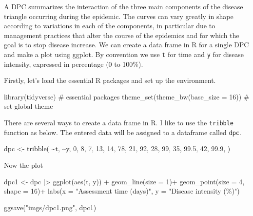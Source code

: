 \documentclass[
  letterpaper,
  DIV=11,
  numbers=noendperiod]{scrreprt}
\newenvironment{Shaded}{\begin{snugshade}}{\end{snugshade}}
\newcommand{\AttributeTok}[1]{\textcolor[rgb]{0.40,0.45,0.13}{#1}}
\newcommand{\CommentTok}[1]{\textcolor[rgb]{0.37,0.37,0.37}{#1}}
\newcommand{\DecValTok}[1]{\textcolor[rgb]{0.68,0.00,0.00}{#1}}
\newcommand{\FloatTok}[1]{\textcolor[rgb]{0.68,0.00,0.00}{#1}}
\newcommand{\FunctionTok}[1]{\textcolor[rgb]{0.28,0.35,0.67}{#1}}
\newcommand{\NormalTok}[1]{\textcolor[rgb]{0.00,0.23,0.31}{#1}}
\newcommand{\OtherTok}[1]{\textcolor[rgb]{0.00,0.23,0.31}{#1}}
\newcommand{\SpecialCharTok}[1]{\textcolor[rgb]{0.37,0.37,0.37}{#1}}
\newcommand{\StringTok}[1]{\textcolor[rgb]{0.13,0.47,0.30}{#1}}
\begin{document}
A DPC summarizes the interaction of the three main components of the
disease triangle occurring during the epidemic. The curves can vary
greatly in shape according to variations in each of the components, in
particular due to management practices that alter the course of the
epidemics and for which the goal is to stop disease increase. We can
create a data frame in R for a single DPC and make a plot using ggplot.
By convention we use \texttt{t} for time and \texttt{y} for disease
intensity, expressed in percentage (0 to 100\%).

Firstly, let's load the essential R packages and set up the environment.

\begin{Shaded}
\begin{Highlighting}[]
\FunctionTok{library}\NormalTok{(tidyverse) }\CommentTok{\# essential packages }
\FunctionTok{theme\_set}\NormalTok{(}\FunctionTok{theme\_bw}\NormalTok{(}\AttributeTok{base\_size =} \DecValTok{16}\NormalTok{)) }\CommentTok{\# set global theme}
\end{Highlighting}
\end{Shaded}

There are several ways to create a data frame in R. I like to use the
\texttt{tribble} function as below. The entered data will be assigned to
a dataframe called \texttt{dpc}.

\begin{Shaded}
\begin{Highlighting}[]
\NormalTok{dpc }\OtherTok{\textless{}{-}} 
  \FunctionTok{tribble}\NormalTok{(}
   \SpecialCharTok{\textasciitilde{}}\NormalTok{t,  }\SpecialCharTok{\textasciitilde{}}\NormalTok{y, }
   \DecValTok{0}\NormalTok{,  }\DecValTok{8}\NormalTok{, }
   \DecValTok{7}\NormalTok{,  }\DecValTok{13}\NormalTok{, }
  \DecValTok{14}\NormalTok{,  }\DecValTok{78}\NormalTok{, }
  \DecValTok{21}\NormalTok{,  }\DecValTok{92}\NormalTok{, }
  \DecValTok{28}\NormalTok{,  }\DecValTok{99}\NormalTok{, }
  \DecValTok{35}\NormalTok{, }\FloatTok{99.5}\NormalTok{, }
  \DecValTok{42}\NormalTok{, }\FloatTok{99.9}\NormalTok{, }
\NormalTok{  )}
\end{Highlighting}
\end{Shaded}

Now the plot

\begin{Shaded}
\begin{Highlighting}[]
\NormalTok{dpc1 }\OtherTok{\textless{}{-}}\NormalTok{ dpc }\SpecialCharTok{|\textgreater{}}
  \FunctionTok{ggplot}\NormalTok{(}\FunctionTok{aes}\NormalTok{(t, y)) }\SpecialCharTok{+}
  \FunctionTok{geom\_line}\NormalTok{(}\AttributeTok{size =} \DecValTok{1}\NormalTok{)}\SpecialCharTok{+}
  \FunctionTok{geom\_point}\NormalTok{(}\AttributeTok{size =} \DecValTok{4}\NormalTok{, }\AttributeTok{shape =} \DecValTok{16}\NormalTok{)}\SpecialCharTok{+}
  \FunctionTok{labs}\NormalTok{(}\AttributeTok{x =} \StringTok{"Assessment time (days)"}\NormalTok{,}
       \AttributeTok{y =} \StringTok{"Disease intensity (\%)"}\NormalTok{)}

\FunctionTok{ggsave}\NormalTok{(}\StringTok{"imgs/dpc1.png"}\NormalTok{, dpc1)}
\end{Highlighting}
\end{Shaded}
\end{document}
